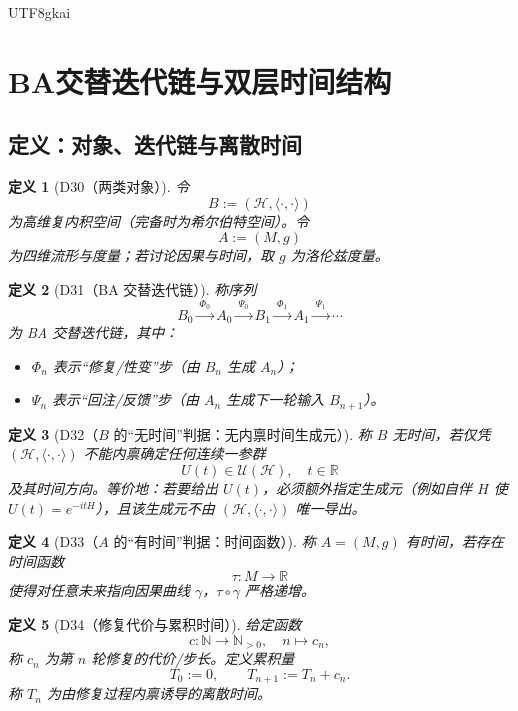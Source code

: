 \documentclass[12pt]{article}
\newtheorem{definition}{定义}[section]
\begin{document}
\begin{CJK*}{UTF8}{gkai}
\clearpage
\section{BA交替迭代链与双层时间结构}
\label{sec:ba-time-dual}

\subsection{定义：对象、迭代链与离散时间}

\begin{definition}[D30（两类对象）]
\label{def:D30}
令
\[
B:=(\mathcal H,\langle\cdot,\cdot\rangle)
\]
为高维复内积空间（完备时为希尔伯特空间）。令
\[
A:=(M,g)
\]
为四维流形与度量；若讨论因果与时间，取 $g$ 为洛伦兹度量。
\end{definition}

\begin{definition}[D31（BA 交替迭代链）]
\label{def:D31}
称序列
\[
B_0 \xrightarrow{\ \Phi_0\ } A_0 \xrightarrow{\ \Psi_0\ } B_1 \xrightarrow{\ \Phi_1\ } A_1 \xrightarrow{\ \Psi_1\ }
  \cdots
\]
为 BA 交替迭代链，其中：
\begin{itemize}
\item $\Phi_n$ 表示“修复/性变”步（由 $B_n$ 生成 $A_n$）；
\item $\Psi_n$ 表示“回注/反馈”步（由 $A_n$ 生成下一轮输入 $B_{n+1}$）。
\end{itemize}
\end{definition}

\begin{definition}[D32（$B$ 的“无时间”判据：无内禀时间生成元）]
\label{def:D32}
称 $B$ \emph{无时间}，若仅凭 $(\mathcal H,\langle\cdot,\cdot\rangle)$ 不能内禀确定任何连续一参群
\[
U(t)\in\mathcal U(\mathcal H),\quad t\in\mathbb R
\]
及其时间方向。等价地：若要给出 $U(t)$，必须额外指定生成元（例如自伴 $H$ 使 $U(t)=e^{-itH}$），且该生成元不由 $(\mathcal H,\langle\cdot,\cdot\rangle)$ 唯一导出。
\end{definition}

\begin{definition}[D33（$A$ 的“有时间”判据：时间函数）]
\label{def:D33}
称 $A=(M,g)$ \emph{有时间}，若存在时间函数
\[
\tau:M\to\mathbb R
\]
使得对任意未来指向因果曲线 $\gamma$，$\tau\circ\gamma$ 严格递增。
\end{definition}

\begin{definition}[D34（修复代价与累积时间）]
\label{def:D34}
给定函数
\[
c:\mathbb N\to \mathbb N_{>0},\quad n\mapsto c_n,
\]
称 $c_n$ 为第 $n$ 轮修复的代价/步长。定义累积量
\[
T_0:=0,\qquad T_{n+1}:=T_n+c_n.
\]
称 $T_n$ 为由修复过程内禀诱导的离散时间。
\end{definition}


\end{CJK*}
\end{document}
